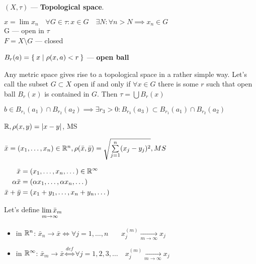 \begin{defn}$(X, \tau)$ --- \textbf{Topological space}.\end{defn}
$x = \lim x_n \quad \forall G \in \tau: x \in G \quad \exists N: \forall n > N \implies x_n \in G$\\
G --- open in $\tau$ \\
$F = X \setminus G$ --- closed
\begin{defn}
  $B_r (a) = \Set{x | \rho(x, a) < r}$ --- \textbf{open ball}
\end{defn}
\begin{stm}
  Any metric space gives rise to a topological space in a rather simple way.
  Let's call the subset $G \subset X$ open if and only if $\forall x \in G$
  there is some $r$ such that open ball $B_r(x)$ is contained in $G$. Then $\tau = \bigcup B_r (x)$
\end{stm}
\begin{stm}
  $b \in B_{r_1} (a_1) \cap B_{r_2} (a_2) \implies \exists r_3 > 0: B_{r_3}
  (a_3) \subset B_{r_1} (a_1) \cap B_{r_2} (a_2)$
\end{stm}
\noindent
\begin{ex}
  $\mathbb{R}, \rho(x, y) = |x - y|$, MS
\end{ex}
\begin{ex}
  $\bar{x} = (x_1, \dotsc, x_n) \in \mathbb{R}^n, \rho(\bar{x}, \bar{y}) = \sqrt{\sum\limits_{j = 1}^n(x_j - y_j)^2}, MS$
\end{ex}
\begin{ex}
    \hspace{-1.9em}$\begin{aligned}[t]
      \bar{x} &= (x_1, \dotsc, x_n, \dotso) \in \mathbb{R}^\infty \\
      \alpha\bar{x} &= (\alpha x_1, \dotsc, \alpha x_n, \dotsc) \\
      \bar{x} + \bar{y} &= (x_1 + y_1, \dotsc, x_n + y_n, \dotsc)
  \end{aligned}$

      Let's define $\alim{\bar{x}_m}{m \to \infty}$
      \begin{itemize}
          \item{in $\mathbb{R}^n$:}
              $\bar{x}_n \to \bar{x} \iff \forall j = 1, \dotsc, n\quad\ \ \:\,x_j^{(m)} \xrightarrow[m \to \infty]{} x_j$
          \item{in $\mathbb{R}^\infty$:}
              $\bar{x}_m \to \bar{x} \overset{def}{\iff} \forall j = 1,2,3,\dotso \quad x_j^{(m)} \xrightarrow[m \to \infty]{} x_j$
      \end{itemize}
\end{ex}
